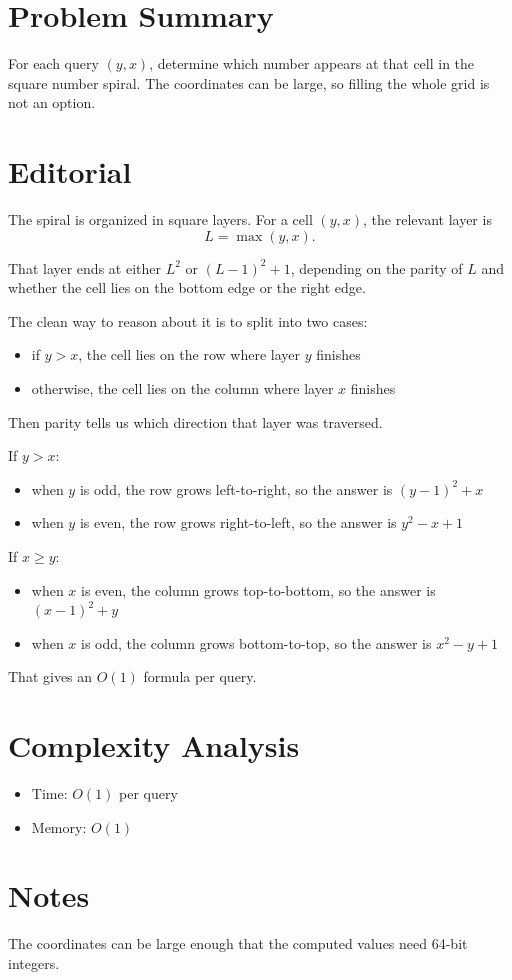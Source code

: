\section{Problem Summary}
For each query \((y, x)\), determine which number appears at that cell in the square number spiral. The coordinates can be large, so filling the whole grid is not an option.

\section{Editorial}
The spiral is organized in square layers. For a cell \((y, x)\), the relevant layer is
\[
L = \max(y, x).
\]

That layer ends at either \(L^2\) or \((L - 1)^2 + 1\), depending on the parity of \(L\) and whether the cell lies on the bottom edge or the right edge.

The clean way to reason about it is to split into two cases:
\begin{itemize}
\item if \(y > x\), the cell lies on the row where layer \(y\) finishes
\item otherwise, the cell lies on the column where layer \(x\) finishes
\end{itemize}

Then parity tells us which direction that layer was traversed.

If \(y > x\):
\begin{itemize}
\item when \(y\) is odd, the row grows left-to-right, so the answer is \((y - 1)^2 + x\)
\item when \(y\) is even, the row grows right-to-left, so the answer is \(y^2 - x + 1\)
\end{itemize}

If \(x \ge y\):
\begin{itemize}
\item when \(x\) is even, the column grows top-to-bottom, so the answer is \((x - 1)^2 + y\)
\item when \(x\) is odd, the column grows bottom-to-top, so the answer is \(x^2 - y + 1\)
\end{itemize}

That gives an \(O(1)\) formula per query.

\section{Complexity Analysis}
\begin{itemize}
\item Time: \(O(1)\) per query
\item Memory: \(O(1)\)
\end{itemize}

\section{Notes}
The coordinates can be large enough that the computed values need 64-bit integers.
